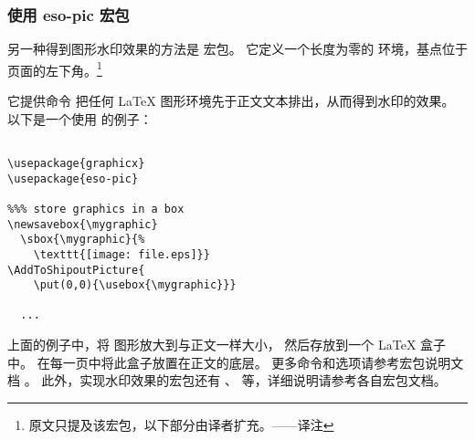 \subsubsection{使用 eso-pic 宏包}\label{sssec:esopic}

另一种得到图形水印效果的方法是  宏包。
它定义一个长度为零的  环境，基点位于页面的左下角。\footnote{
原文只提及该宏包，以下部分由译者扩充。——译注}

它提供命令  把任何 \LaTeX{} 图形环境先于正文文本排出，从而得到水印的效果。
以下是一个使用  的例子：

\begin{lstlisting}

\usepackage{graphicx}
\usepackage{eso-pic}

%%% store graphics in a box
\newsavebox{\mygraphic}
  \sbox{\mygraphic}{%
    \texttt{[image: file.eps]}}
\AddToShipoutPicture{
    \put(0,0){\usebox{\mygraphic}}}

  ...

\end{lstlisting}

上面的例子中，将  图形放大到与正文一样大小，
然后存放到一个 \LaTeX{} 盒子中。
在每一页中将此盒子放置在正文的底层。
更多命令和选项请参考宏包说明文档 \cite{eso-pic-doc}。
此外，实现水印效果的宏包还有  \cite{background-doc}、 \cite{xwatermark-doc} 等，详细说明请参考各自宏包文档。

\endinput
